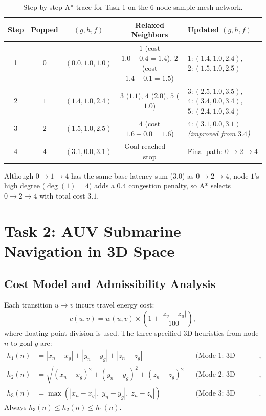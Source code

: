 \documentclass[11pt,a4paper]{article}
\begin{document}
\begin{table}[h]
\centering
\caption{Step-by-step A* trace for Task 1 on the 6-node sample mesh network.}
\label{tab:task1-trace}
\begin{tabular}{@{}c c c c l@{}}
\toprule
Step & Popped & $(g, h, f)$ & Relaxed Neighbors & Updated $(g, h, f)$ \\
\midrule
1 & $0$ & $(0.0, 1.0, 1.0)$ & $1$ (cost $1.0+0.4=1.4$), $2$ (cost $1.4+0.1=1.5$) & $1:(1.4,1.0,2.4)$, $2:(1.5,1.0,2.5)$ \\
2 & $1$ & $(1.4, 1.0, 2.4)$ & $3$ ($1.1$), $4$ ($2.0$), $5$ ($1.0$) & $3:(2.5,1.0,3.5)$, $4:(3.4,0.0,3.4)$, $5:(2.4,1.0,3.4)$ \\
3 & $2$ & $(1.5, 1.0, 2.5)$ & $4$ (cost $1.6+0.0=1.6$) & $4:(3.1,0.0,3.1)$ \emph{(improved from $3.4$)} \\
4 & $4$ & $(3.1, 0.0, 3.1)$ & Goal reached --- stop & Final path: $0 \to 2 \to 4$ \\
\bottomrule
\end{tabular}
\end{table}

Although $0 \to 1 \to 4$ has the same base latency sum ($3.0$) as $0 \to 2 \to 4$, node $1$'s high degree ($\deg(1)=4$) adds a $0.4$ congestion penalty, so A* selects $0 \to 2 \to 4$ with total cost $3.1$.

\section{Task 2: AUV Submarine Navigation in 3D Space}

\subsection{Cost Model and Admissibility Analysis}
Each transition $u \to v$ incurs travel energy cost:
\[
    c(u, v) = w(u, v) \times \left(1 + \frac{|z_v - z_u|}{100}\right),
\]
where floating-point division is used. The three specified 3D heuristics from node $n$ to goal $g$ are:
\begin{align*}
    h_1(n) &= |x_n - x_g| + |y_n - y_g| + |z_n - z_g| && \text{(Mode 1: 3D Manhattan)}, \\
    h_2(n) &= \sqrt{(x_n - x_g)^2 + (y_n - y_g)^2 + (z_n - z_g)^2} && \text{(Mode 2: 3D Euclidean)}, \\
    h_3(n) &= \max(|x_n - x_g|, |y_n - y_g|, |z_n - z_g|) && \text{(Mode 3: 3D Chebyshev)}.
\end{align*}
Always $h_3(n) \le h_2(n) \le h_1(n)$.
\end{document}

